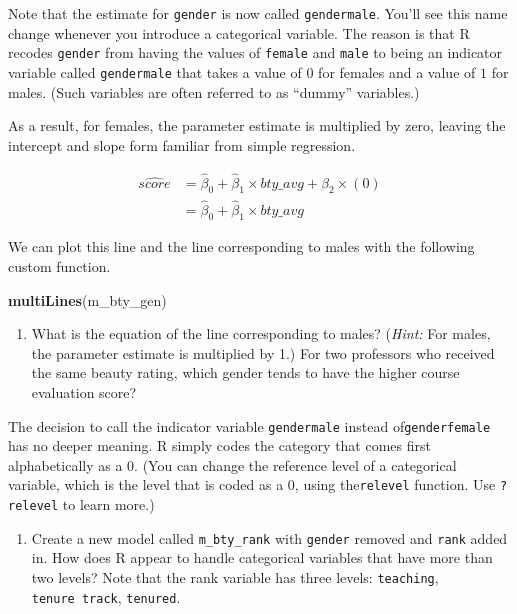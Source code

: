 \documentclass[]{book}
\newenvironment{Shaded}{\begin{snugshade}}{\end{snugshade}}
\newcommand{\KeywordTok}[1]{\textcolor[rgb]{0.13,0.29,0.53}{\textbf{{#1}}}}
\newcommand{\NormalTok}[1]{{#1}}
\providecommand{\tightlist}{%
  \setlength{\itemsep}{0pt}\setlength{\parskip}{0pt}}
\theoremstyle{definition}
\theoremstyle{definition}
\theoremstyle{remark}
\begin{document}
Note that the estimate for \texttt{gender} is now called
\texttt{gendermale}. You'll see this name change whenever you introduce
a categorical variable. The reason is that R recodes \texttt{gender}
from having the values of \texttt{female} and \texttt{male} to being an
indicator variable called \texttt{gendermale} that takes a value of
\(0\) for females and a value of \(1\) for males. (Such variables are
often referred to as ``dummy'' variables.)

As a result, for females, the parameter estimate is multiplied by zero,
leaving the intercept and slope form familiar from simple regression.

\[
  \begin{aligned}
\widehat{score} &= \hat{\beta}_0 + \hat{\beta}_1 \times bty\_avg + \hat{\beta}_2 \times (0) \\
&= \hat{\beta}_0 + \hat{\beta}_1 \times bty\_avg\end{aligned}
\]

We can plot this line and the line corresponding to males with the
following custom function.

\begin{Shaded}
\begin{Highlighting}[]
\KeywordTok{multiLines}\NormalTok{(m_bty_gen)}
\end{Highlighting}
\end{Shaded}

\begin{enumerate}
\def\labelenumi{\arabic{enumi}.}
\setcounter{enumi}{8}
\tightlist
\item
  What is the equation of the line corresponding to males? (\emph{Hint:}
  For males, the parameter estimate is multiplied by 1.) For two
  professors who received the same beauty rating, which gender tends to
  have the higher course evaluation score?
\end{enumerate}

The decision to call the indicator variable \texttt{gendermale} instead
of\texttt{genderfemale} has no deeper meaning. R simply codes the
category that comes first alphabetically as a \(0\). (You can change the
reference level of a categorical variable, which is the level that is
coded as a 0, using the\texttt{relevel} function. Use \texttt{?relevel}
to learn more.)

\begin{enumerate}
\def\labelenumi{\arabic{enumi}.}
\setcounter{enumi}{9}
\tightlist
\item
  Create a new model called \texttt{m\_bty\_rank} with \texttt{gender}
  removed and \texttt{rank} added in. How does R appear to handle
  categorical variables that have more than two levels? Note that the
  rank variable has three levels: \texttt{teaching},
  \texttt{tenure\ track}, \texttt{tenured}.
\end{enumerate}
\end{document}
